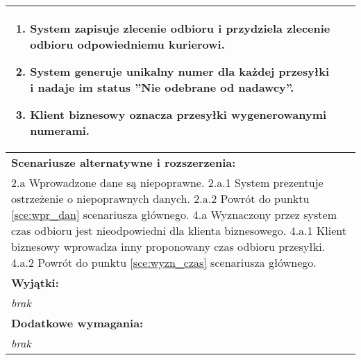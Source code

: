 \begin{center}
\begin{longtable}[h]{|p{1.6cm}|p{13.5cm}|}
{\begin{enumerate}
\item System zapisuje zlecenie odbioru i przydziela zlecenie odbioru odpowiedniemu kurierowi.
\item System generuje unikalny numer dla każdej przesyłki i nadaje im status ''Nie odebrane od nadawcy''.
\item Klient biznesowy oznacza przesyłki wygenerowanymi numerami.
\end{enumerate}
} \\ \hline
\multicolumn{2}{|p{15.1cm}|}{\textbf{Scenariusze alternatywne i rozszerzenia:}} \\
\multicolumn{2}{|p{15.1cm}|}{
2.a Wprowadzone dane są niepoprawne. \newline
2.a.1 System prezentuje ostrzeżenie o niepoprawnych danych. \newline
2.a.2 Powrót do punktu \ref{sce:wpr_dan} scenariusza głównego. \newline
\newline
4.a Wyznaczony przez system czas odbioru jest nieodpowiedni dla klienta biznesowego. \newline
4.a.1 Klient biznesowy wprowadza inny proponowany czas odbioru przesyłki. \newline
4.a.2 Powrót do punktu \ref{sce:wyzn_czas} scenariusza głównego.
} 
\\ \hline
\multicolumn{2}{|p{15.1cm}|}{\textbf{Wyjątki:}} \\
\multicolumn{2}{|p{15.1cm}|}{
\textit{brak}
} \\ \hline
\multicolumn{2}{|p{15.1cm}|}{\textbf{Dodatkowe wymagania:}} \\
\multicolumn{2}{|p{15.1cm}|}{\textit{brak}
} \\
\hline
\end{longtable}
\end{center}

